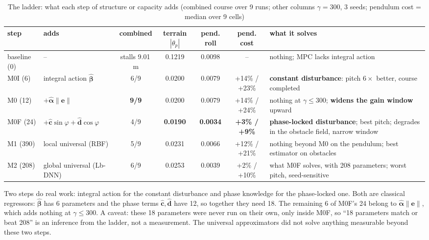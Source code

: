 \documentclass[conference]{IEEEtran}
\begin{document}
\begin{table}[t]
\centering
\caption{The ladder: what each step of structure or capacity adds
(combined course over 9 runs; other columns $\gamma=300$, 3 seeds;
pendulum cost = median over 9 cells)}
\label{tab:ladder}
\renewcommand{\arraystretch}{1.15}
\setlength{\tabcolsep}{4pt}
\begin{tabular}{>{\raggedright}p{1.45cm}>{\raggedright}p{2.5cm}cccc>{\raggedright\arraybackslash}p{5.0cm}}
\hline
step & adds & combined & terrain $|\theta_p|$ & pend. roll & pend. cost & what it solves\\
\hline
baseline (0) & -- & stalls 9.01\,m & 0.1219 & 0.0098 & -- & nothing; MPC lacks integral action\\
M0I (6) & integral action $\hat{\bm\beta}$ & 6/9 & 0.0200 & 0.0079 & +14\% / +23\% & \textbf{constant disturbance}: pitch $6\times$ better, course completed\\
M0 (12) & $+\hat{\bm\alpha}\|\bm e\|$ & \textbf{9/9} & 0.0200 & 0.0079 & +14\% / +24\% & nothing at $\gamma\le300$; \textbf{widens the gain window} upward\\
M0F (24) & $+\hat{\bm c}\sin\varphi+\hat{\bm d}\cos\varphi$ & 4/9 & \textbf{0.0190} & \textbf{0.0034} & \textbf{+3\% / +9\%} & \textbf{phase-locked disturbance}; best pitch; degrades in the obstacle field, narrow window\\
M1 (390) & local universal (RBF) & 5/9 & 0.0231 & 0.0066 & +12\% / +21\% & nothing beyond M0 on the pendulum; best estimator on obstacles\\
M2 (208) & global universal (Lb-DNN) & 6/9 & 0.0253 & 0.0039 & +2\% / +10\% & what M0F solves, with 208 parameters; worst pitch, seed-sensitive\\
\hline
\end{tabular}
\end{table}

Two steps do real work: integral action for the constant disturbance and
phase knowledge for the phase-locked one. Both are classical
regressors: $\hat{\bm\beta}$ has 6 parameters and the phase terms
$\hat{\bm c},\hat{\bm d}$ have 12, so together they need 18. The
remaining 6 of M0F's 24 belong to $\hat{\bm\alpha}\|\bm e\|$, which adds
nothing at $\gamma\le300$. A caveat: these 18 parameters were never run
on their own, only inside M0F, so ``18 parameters match or beat 208'' is
an inference from the ladder, not a measurement. The universal
approximators did not solve anything measurable beyond these two steps.
\end{document}
